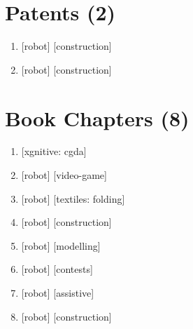 \documentclass{article}
\begin{document}
\section*{Patents (2)}
\begin{enumerate}
  \item {} [robot] [construction]
  \item {} [robot] [construction]
\end{enumerate}

\section*{Book Chapters (8)}
\begin{enumerate}
  \item {} [xgnitive: cgda]
  \item {} [robot] [video-game]
  \item {} [robot] [textiles: folding]
  \item {} [robot] [construction]
  \item {} [robot] [modelling]
  \item {} [robot] [contests]
  \item {} [robot] [assistive]
  \item {} [robot] [construction]
\end{enumerate}
\end{document}

